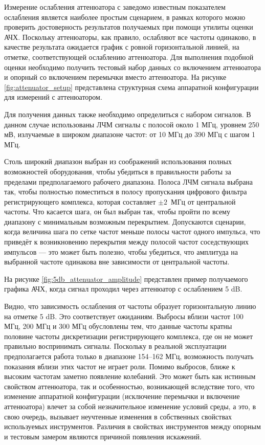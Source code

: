 \documentclass{report}
\begin{document}
Измерение ослабления аттенюатора с заведомо известным показателем ослабления является наиболее простым сценарием, в рамках которого можно проверить достоверность результатов получаемых при помощи утилиты оценки АЧХ. Поскольку аттенюаторы, как правило, ослабляют все частоты одинаково, в качестве результата ожидается график с ровной горизонтальной линией, на отметке, соответствующей ослаблению аттенюатора. Для выполнения подобной оценки необходимо получить тестовый набор данных со включением аттенюатора и опорный со включением перемычки вместо аттенюатора. На рисунке \ref{fig:attenuator_setup} представлена структурная схема аппаратной конфигурации для измерений с аттенюатором.


Для получения данных также необходимо определиться с набором сигналов. В данном случае использованы ЛЧМ сигналы с полосой около 1 МГц, уровнем 250 мВ, излучаемые в широком диапазоне частот: от 10 МГц до 390 МГц с шагом 1 МГц.

Столь широкий диапазон выбран из соображений использования полных возможностей оборудования, чтобы убедиться в правильности работы за пределами предполагаемого рабочего диапазона. Полоса ЛЧМ сигнала выбрана так, чтобы полностью поместиться в полосу пропускания цифрового фильтра регистрирующего комплекса, которая составляет $\pm 2$~МГц от центральной частоты. Что касается шага, он был выбран так, чтобы пройти по всему диапазону с минимальным возможным перекрытием. Допускаются сценарии, когда величина шага по сетке частот меньше полосы частот одного импульса, что приведёт к возникновению перекрытия между полосой частот соседствующих импульсов --- это может быть полезно, чтобы убедиться, что амплитуда на выбранной частоте одинакова вне зависимости от центральной частоты.

На рисунке \ref{fig:5db_attenuator_amplitude} представлен пример получаемого графика АЧХ, когда сигнал проходил через аттенюатор с ослаблением 5 dB.


Видно, что зависимость ослабления от частоты образует горизонтальную линию на отметке 5 dB. Это соответствует ожиданиям. Выбросы вблизи частот 100 МГц, 200 МГц и 300 МГц обусловлены тем, что данные частоты кратны половине частоты дискретизации регистрирующего комплекса, где он не может правильно воспринимать сигналы. Поскольку в реальной эксплуатации предполагается работа только в диапазоне 154--162 МГц, возможность получать показания вблизи этих частот не играет роли. Помимо выбросов, ближе к высоким частотам заметно появление колебаний. Это может быть как истинным свойством аттенюатора, так и особенностью, возникающей вследствие того, что изменение аппаратной конфигурации (исключение перемычки и включение аттенюатора) влечет за собой незначительное изменение условий среды, а это, в свою очередь, вызывает неучтенные изменения в собственных свойствах используемых инструментов. Различия в свойствах инструментов между опорным и тестовым замером являются причиной появления искажений.
\end{document}
